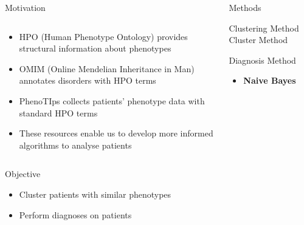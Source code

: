 \documentclass[final]{beamer} %
\begin{document}
\begin{frame}{}
\begin{columns}[T]
\begin{column}{0.3\linewidth}
\begin{block}{\Huge Motivation}
\begin{columns}[T]
      \begin{column}{.5\textwidth}
	    \Large
        \begin{itemize}
          \item
          HPO (Human Phenotype Ontology) provides structural information about phenotypes
          \vspace{2cm}
          \item
          OMIM (Online Mendelian Inheritance in Man) annotates disorders with HPO terms
          \vspace{2cm}
          \item
          PhenoTIps collects patients' phenotype data with standard HPO terms
          \vspace{2cm}
          \item 
          These resources enable us to develop more informed algorithms to analyse patients
      \end{itemize}  
      \vspace{5cm}
      \end{column}
    \end{columns}

    \end{block}
    \begin{block}{\Huge Objective}
     \begin{itemize}
    \Large
     \item
     Cluster patients with similar phenotypes
    \item
    Perform diagnoses on patients
     \end{itemize}
      \end{block}
    \end{column}

    \begin{column}{0.3\linewidth}
    \begin{block}{\Huge Methods}
   
     \begin{block}{\LARGE Clustering Method}
     \Large Cluster Method
     \end{block}
     \vspace{3cm}


     \begin{block}{\LARGE Diagnosis Method}
     \begin{itemize}
      \item 
     \LARGE \textbf{Naive Bayes}


\end{itemize}
\end{block}
\end{block}
\end{column}
\end{columns}
\end{frame}
\end{document}
